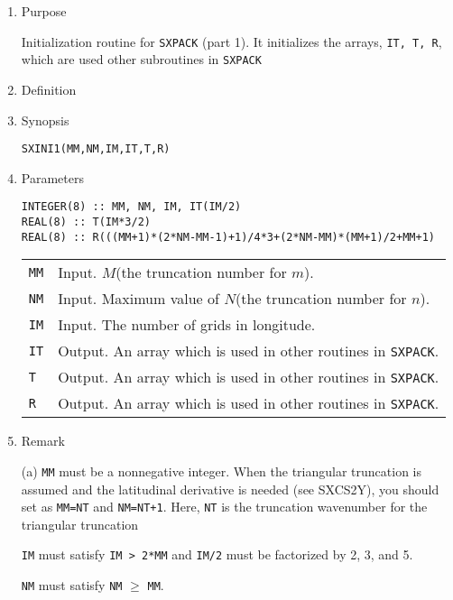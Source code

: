 \documentclass[a4paper]{scrartcl}
\begin{document}
\begin{enumerate}

\item Purpose

Initialization routine for \texttt{SXPACK} (part 1).
It initializes the arrays, \texttt{IT, T, R},
which are used other subroutines in \texttt{SXPACK}

\item Definition

\item Synopsis 
    
\texttt{SXINI1(MM,NM,IM,IT,T,R)}

\item Parameters
\begin{verbatim}  
INTEGER(8) :: MM, NM, IM, IT(IM/2)
REAL(8) :: T(IM*3/2)
REAL(8) :: R(((MM+1)*(2*NM-MM-1)+1)/4*3+(2*NM-MM)*(MM+1)/2+MM+1)
\end{verbatim}  
    
\begin{tabular}{ll}
\texttt{MM} & Input. $M$(the truncation number for $m$).\\
\texttt{NM} & Input. Maximum value of $N$(the truncation 
  number for $n$).\\
\texttt{IM}  & Input. The number of grids in longitude.\\
\texttt{IT}  & Output. An array which is used in other routines in \texttt{SXPACK}.\\
\texttt{T}   & Output. An array which is used in other routines in \texttt{SXPACK}.\\
\texttt{R}  & Output. An array which is used in other routines in \texttt{SXPACK}.\\
\end{tabular}

\item Remark

(a) \texttt{MM} must be a nonnegative integer.
 When the triangular truncation is assumed and
 the latitudinal derivative is needed (see SXCS2Y),
 you should set as \texttt{MM=NT} and \texttt{NM=NT+1}.
 Here, \texttt{NT} is the truncation wavenumber for 
  the triangular truncation
  
\texttt{IM} must satisfy \texttt{IM > 2*MM} and
\texttt{IM/2} must be factorized by 2, 3, and 5.

\texttt{NM} must satisfy 
\texttt{NM} $\ge$ \texttt{MM}.

\end{enumerate}

\end{document}
